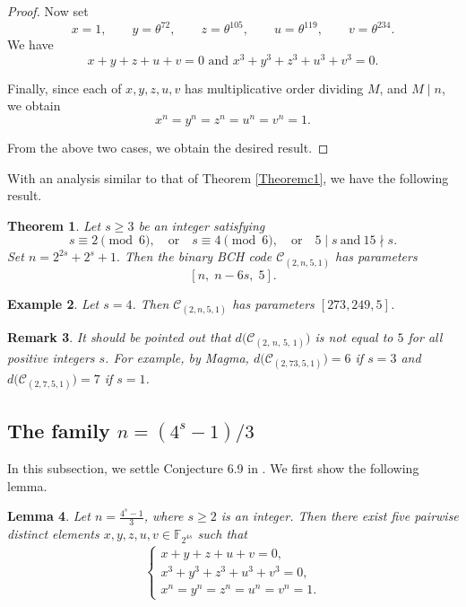 \documentclass[12pt,draftcls,journal,onecolumn]{IEEEtran}
\newtheorem{theorem}{Theorem}
\newtheorem{lemma}[theorem]{Lemma}
\newtheorem{remark}[theorem]{Remark}
\newtheorem{example}[theorem]{Example}
\begin{document}
\begin{proof}
Now set
\[
x=1,\qquad
y=\theta^{72},\qquad
z=\theta^{105},\qquad
u=\theta^{119},\qquad
v=\theta^{234}.
\]
We have
\[
x+y+z+u+v=0
\,\,\text{and}\,\,
x^3+y^3+z^3+u^3+v^3=0.
\]

Finally, since each of \(x,y,z,u,v\) has multiplicative order
dividing \(M\), and \(M\mid n\), we obtain
\[
x^n=y^n=z^n=u^n=v^n=1.
\]

From the above two cases, we obtain the desired result.
\end{proof}



With an analysis similar to that of Theorem \ref{Theoremc1}, we have the following result.

\begin{theorem}
 Let \(s\ge 3\) be an integer satisfying
\[
s\equiv 2\pmod 6,
\quad\text{or}\quad
s\equiv 4\pmod 6,
\quad\text{or}\quad
5\mid s\ \text{and}\ 15\nmid s.
\]
Set
\(
n=2^{2s}+2^s+1.
\)
Then the binary BCH code \(\mathcal C_{(2,n,5,1)}\) has parameters
\[
[n,\; n-6s,\; 5].
\]
\end{theorem}



\begin{example}
Let \( s = 4 \). Then \( \mathcal{C}_{(2,n,5,1)} \) has parameters \([273,249,5]\).
\end{example}


\begin{remark}
It should be pointed out that
$
d\bigl(\mathcal{C}_{(2,\,n,\,5,\,1)}\bigr)
$
is not equal to \(5\) for all positive integers \(s\). For example, by Magma,
$d\bigl(\mathcal{C}_{(2,73,5,1)}\bigr)=6$ if \(s=3\) and
$d\bigl(\mathcal{C}_{(2,7,5,1)}\bigr)=7$ if $s=1$.
\end{remark}


\subsection{The family $n=(4^s-1)/3$}

In this subsection, we settle Conjecture 6.9 in \cite{Chen59}. We first show the following lemma.


\begin{lemma}\label{lm:Con3}
Let $
n=\frac{4^s-1}{3}
$, where $s\ge 2$ is an integer.
Then there exist five pairwise distinct elements
$
x,y,z,u,v\in \mathbb{F}_{2^{4s}}
$
such that
\begin{eqnarray}\label{eq:oct1027}
\begin{cases}
x+y+z+u+v=0,  \\
x^3+y^3+z^3+u^3+v^3=0,\\
x^n=y^n=z^n=u^n=v^n=1.
\end{cases}
\end{eqnarray}
\end{lemma}
\end{document}
